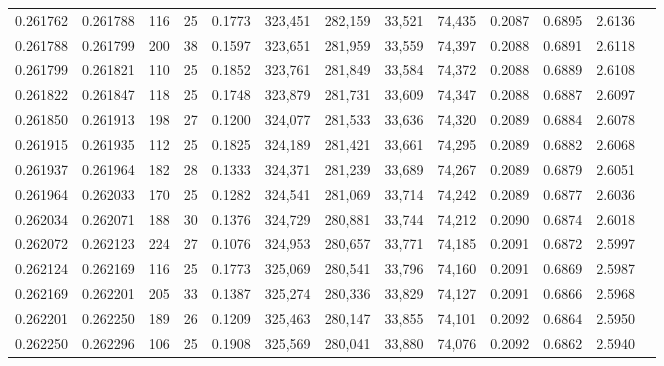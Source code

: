 \begin{tabular}{rrrrrrrrrrrrr}
0.261762 & 0.261788 &   116 &  25 &                                     0.1773 & 323,451 & 282,159 &  33,521 &  74,435 & 0.2087 & 0.6895 & 2.6136 \\
0.261788 & 0.261799 &   200 &  38 &                                     0.1597 & 323,651 & 281,959 &  33,559 &  74,397 & 0.2088 & 0.6891 & 2.6118 \\
0.261799 & 0.261821 &   110 &  25 &                                     0.1852 & 323,761 & 281,849 &  33,584 &  74,372 & 0.2088 & 0.6889 & 2.6108 \\
0.261822 & 0.261847 &   118 &  25 &                                     0.1748 & 323,879 & 281,731 &  33,609 &  74,347 & 0.2088 & 0.6887 & 2.6097 \\
0.261850 & 0.261913 &   198 &  27 &                                     0.1200 & 324,077 & 281,533 &  33,636 &  74,320 & 0.2089 & 0.6884 & 2.6078 \\
0.261915 & 0.261935 &   112 &  25 &                                     0.1825 & 324,189 & 281,421 &  33,661 &  74,295 & 0.2089 & 0.6882 & 2.6068 \\
0.261937 & 0.261964 &   182 &  28 &                                     0.1333 & 324,371 & 281,239 &  33,689 &  74,267 & 0.2089 & 0.6879 & 2.6051 \\
0.261964 & 0.262033 &   170 &  25 &                                     0.1282 & 324,541 & 281,069 &  33,714 &  74,242 & 0.2089 & 0.6877 & 2.6036 \\
0.262034 & 0.262071 &   188 &  30 &                                     0.1376 & 324,729 & 280,881 &  33,744 &  74,212 & 0.2090 & 0.6874 & 2.6018 \\
0.262072 & 0.262123 &   224 &  27 &                                     0.1076 & 324,953 & 280,657 &  33,771 &  74,185 & 0.2091 & 0.6872 & 2.5997 \\
0.262124 & 0.262169 &   116 &  25 &                                     0.1773 & 325,069 & 280,541 &  33,796 &  74,160 & 0.2091 & 0.6869 & 2.5987 \\
0.262169 & 0.262201 &   205 &  33 &                                     0.1387 & 325,274 & 280,336 &  33,829 &  74,127 & 0.2091 & 0.6866 & 2.5968 \\
0.262201 & 0.262250 &   189 &  26 &                                     0.1209 & 325,463 & 280,147 &  33,855 &  74,101 & 0.2092 & 0.6864 & 2.5950 \\
0.262250 & 0.262296 &   106 &  25 &                                     0.1908 & 325,569 & 280,041 &  33,880 &  74,076 & 0.2092 & 0.6862 & 2.5940 \\

\end{tabular}
